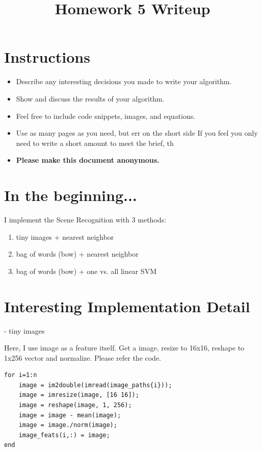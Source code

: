 \title{\vspace{-1cm}Homework 5 Writeup}



\maketitle
\vspace{-3cm}
\thispagestyle{fancy}

\section*{Instructions}
\begin{itemize}
  \item Describe any interesting decisions you made to write your algorithm.
  \item Show and discuss the results of your algorithm.
  \item Feel free to include code snippets, images, and equations.
  \item Use as many pages as you need, but err on the short side If you feel you only need to write a short amount to meet the brief, th
  
  \item \textbf{Please make this document anonymous.}
\end{itemize}

\section*{In the beginning...}

I implement the Scene Recognition with 3 methods:
\begin{enumerate}
    \item tiny images + nearest neighbor
    \item bag of words (bow) + nearest neighbor
    \item bag of words (bow) + one vs. all linear SVM
\end{enumerate}

\section*{Interesting Implementation Detail}

- tiny images

Here, I use image as a feature itself. Get a image, resize to 16x16, reshape to 1x256 vector and normalize. Please refer the code.
\begin{lstlisting}[style=Matlab-editor]
for i=1:n
    image = im2double(imread(image_paths{i}));
    image = imresize(image, [16 16]);
    image = reshape(image, 1, 256);
    image = image - mean(image);
    image = image./norm(image);
    image_feats(i,:) = image;
end
\end{lstlisting}

